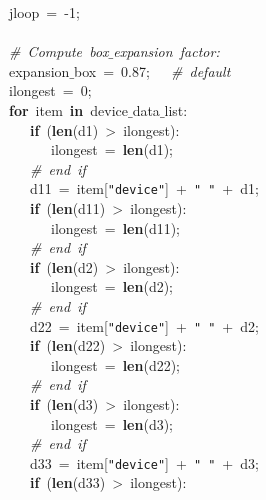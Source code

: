 \mbox{}\ \ \ \ \ \ jloop\ =\ -1; \\
\mbox{}\ \ \ \ \ \  \\
\mbox{}\ \ \ \ \ \ \textit{\#\ Compute\ box$\_$expansion\ factor:} \\
\mbox{}\ \ \ \ \ \ expansion$\_$box\ =\ 0.87;\ \ \ \textit{\#\ default} \\
\mbox{}\ \ \ \ \ \ ilongest\ =\ 0; \\
\mbox{}\ \ \ \ \ \ \textbf{for}\ item\ \textbf{in}\ device$\_$data$\_$list: \\
\mbox{}\ \ \ \ \ \ \ \ \ \textbf{if}\ (\textbf{len}(d1)\ \textgreater{}\ ilongest): \\
\mbox{}\ \ \ \ \ \ \ \ \ \ \ \ ilongest\ =\ \textbf{len}(d1); \\
\mbox{}\ \ \ \ \ \ \ \ \ \textit{\#\ end\ if} \\
\mbox{}\ \ \ \ \ \ \ \ \ d11\ =\ item[\texttt{"{}device"{}}]\ +\ \texttt{"{}\ "{}}\ +\ d1; \\
\mbox{}\ \ \ \ \ \ \ \ \ \textbf{if}\ (\textbf{len}(d11)\ \textgreater{}\ ilongest): \\
\mbox{}\ \ \ \ \ \ \ \ \ \ \ \ ilongest\ =\ \textbf{len}(d11); \\
\mbox{}\ \ \ \ \ \ \ \ \ \textit{\#\ end\ if} \\
\mbox{}\ \ \ \ \ \ \ \ \ \textbf{if}\ (\textbf{len}(d2)\ \textgreater{}\ ilongest): \\
\mbox{}\ \ \ \ \ \ \ \ \ \ \ \ ilongest\ =\ \textbf{len}(d2); \\
\mbox{}\ \ \ \ \ \ \ \ \ \textit{\#\ end\ if} \\
\mbox{}\ \ \ \ \ \ \ \ \ d22\ =\ item[\texttt{"{}device"{}}]\ +\ \texttt{"{}\ "{}}\ +\ d2; \\
\mbox{}\ \ \ \ \ \ \ \ \ \textbf{if}\ (\textbf{len}(d22)\ \textgreater{}\ ilongest): \\
\mbox{}\ \ \ \ \ \ \ \ \ \ \ \ ilongest\ =\ \textbf{len}(d22); \\
\mbox{}\ \ \ \ \ \ \ \ \ \textit{\#\ end\ if} \\
\mbox{}\ \ \ \ \ \ \ \ \ \textbf{if}\ (\textbf{len}(d3)\ \textgreater{}\ ilongest): \\
\mbox{}\ \ \ \ \ \ \ \ \ \ \ \ ilongest\ =\ \textbf{len}(d3); \\
\mbox{}\ \ \ \ \ \ \ \ \ \textit{\#\ end\ if} \\
\mbox{}\ \ \ \ \ \ \ \ \ d33\ =\ item[\texttt{"{}device"{}}]\ +\ \texttt{"{}\ "{}}\ +\ d3; \\
\mbox{}\ \ \ \ \ \ \ \ \ \textbf{if}\ (\textbf{len}(d33)\ \textgreater{}\ ilongest): \\
